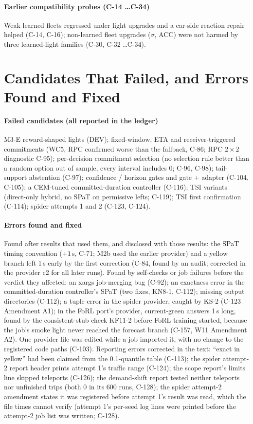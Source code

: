 \paragraph{Earlier compatibility probes (C-14 \dots C-34)} Weak learned fleets regressed under light upgrades and a car-side reaction repair
helped (C-14, C-16); non-learned fleet upgrades ($\sigma$, ACC) were not harmed by three learned-light families (C-30, C-32 \dots C-34).

\section{Candidates That Failed, and Errors Found and Fixed}\label{app:errors}
\paragraph{Failed candidates (all reported in the ledger)} M3-E reward-shaped lights (DEV); fixed-window, ETA and receiver-triggered
commitments (WC5, RPC confirmed worse than the fallback, C-86; RPC $2\times2$ diagnostic C-95); per-decision commitment selection (no
selection rule better than a random option out of sample, every interval includes 0; C-96, C-98); tail-support abstention (C-97);
confidence / horizon gates and gate + adapter (C-104, C-105); a CEM-tuned
committed-duration controller (C-116); TSI variants (direct-only hybrid, no SPaT on permissive lefts; C-119); TSI first confirmation
(C-114); spider attempts 1 and 2 (C-123, C-124).
\paragraph{Errors found and fixed} Found after results that used them, and disclosed with those results: the SPaT timing convention
($+1$\,s, C-71; M2b used the earlier provider) and a yellow branch left 1\,s early by the first correction (C-84, found by an audit;
corrected in the provider c2 for all later runs). Found by self-checks or job failures before the verdict they affected: an xargs job-merging bug (C-92); an exactness error in the committed-duration controller's SPaT (two fixes, KN8-1, C-112);
missing output directories (C-112); a tuple error in the spider provider, caught by KS-2 (C-123 Amendment A1); in the FoRL port's provider, current-green answers 1\,s long, found by the consistent-stub check KF11-2 before FoRL training started, because the job's smoke light never reached the forecast branch (C-157, W11 Amendment A2). One provider file was edited
while a job imported it, with no change to the registered code paths (C-103).
Reporting errors corrected in the text: ``exact in yellow'' had been claimed from the 0.1-quantile table (C-113); the spider attempt-2
report header prints attempt 1's traffic range (C-124); the scope report's limits line skipped teleports (C-126); the demand-shift report tested neither teleports nor unfinished trips (both 0
in its 600 runs, C-128); the spider attempt-2 amendment states it was registered before attempt 1's result was read, which the file
times cannot verify (attempt 1's per-seed log lines were printed before the attempt-2 job list was written; C-128).
